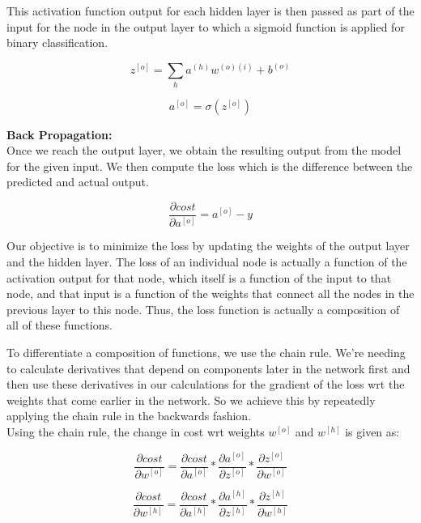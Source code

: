 This activation function output for each hidden layer is then passed as part of the input for the node in the output layer to which a sigmoid function is applied for binary classification.

\begin{equation}
z^{[o]} = \sum_{h} a^{(h)}w^{(o)(i)} + b^{(o)}
\end{equation}

\begin{equation}
a^{[o]} = \sigma(z^{[o]})
\end{equation}

\noindent \textbf{Back Propagation:}\\

Once we reach the output layer, we obtain the resulting output from the model for the given input. We then compute the loss which is the difference between the predicted and actual output.

\begin{equation}
\frac{\partial cost}{\partial a^{[o]}} = a^{[o]}-y
\end{equation}

Our objective is to minimize the loss by updating the weights of the output layer and the hidden layer. The loss of an individual node is actually a function of the activation output for that node, which itself is a function of the input to that node, and that input is a function of the weights that connect all the nodes in the previous layer to this node. Thus, the loss function is actually a composition of all of these functions.

To differentiate a composition of functions, we use the chain rule. We're needing to calculate derivatives that depend on components later in the network first and then use these derivatives in our calculations for the gradient of the loss wrt the weights that come earlier in the network. So we achieve this by repeatedly applying the chain rule in the backwards fashion.\\

\noindent Using the chain rule, the change in cost wrt weights $w^{[o]}$ and $w^{[h]}$ is given as:

\begin{equation}
\frac{\partial cost}{\partial w^{[o]}} = \frac{\partial cost}{\partial a^{[o]}} * \frac{\partial a^{[o]}}{\partial z^{[o]}} * \frac{\partial z^{[o]}}{\partial w^{[o]}}
\end{equation}

\begin{equation}
\frac{\partial cost}{\partial w^{[h]}} = \frac{\partial cost}{\partial a^{[h]}} * \frac{\partial a^{[h]}}{\partial z^{[h]}} * \frac{\partial z^{[h]}}{\partial w^{[h]}}
\end{equation}

